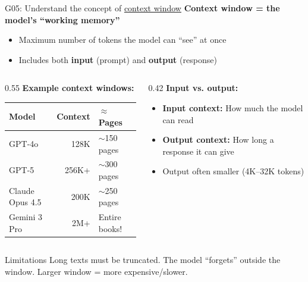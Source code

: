 \documentclass[aspectratio=169, 10pt]{beamer}
\begin{document}
\begin{frame}{G05: Understand the concept of \href{https://en.wikipedia.org/wiki/Context_window}{context window}}
    \textbf{Context window = the model's ``working memory''}
    \begin{itemize}
        \item Maximum number of tokens the model can ``see'' at once
        \item Includes both \textbf{input} (prompt) and \textbf{output} (response)
    \end{itemize}

    \vspace{0.2cm}
    \begin{columns}[T]
        \begin{column}{0.55\textwidth}
            \textbf{Example context windows:}
            \footnotesize
            \begin{tabular}{lrl}
                \toprule
                Model & Context & $\approx$ Pages \\
                \midrule
                GPT-4o & 128K & $\sim$150 pages \\
                GPT-5 & 256K+ & $\sim$300 pages \\
                Claude Opus 4.5 & 200K & $\sim$250 pages \\
                Gemini 3 Pro & 2M+ & Entire books! \\
                \bottomrule
            \end{tabular}
        \end{column}
        \begin{column}{0.42\textwidth}
            \textbf{Input vs. output:}
            \footnotesize
            \begin{itemize}
                \item \textbf{Input context:} How much the model can read
                \item \textbf{Output context:} How long a response it can give
                \item Output often smaller (4K--32K tokens)
            \end{itemize}
        \end{column}
    \end{columns}

    \vspace{0.1cm}
    \begin{alertblock}{\footnotesize Limitations}
        \footnotesize
        Long texts must be truncated. The model ``forgets'' outside the window. Larger window = more expensive/slower.
    \end{alertblock}
\end{frame}
\end{document}
